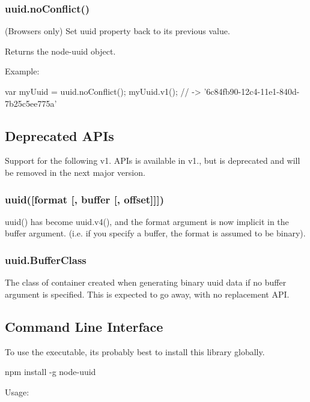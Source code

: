 \subsubsection*{uuid.\+no\+Conflict()}

(Browsers only) Set {\ttfamily uuid} property back to it\textquotesingle{}s previous value.

Returns the node-\/uuid object.

Example\+:


\begin{DoxyCode}
var myUuid = uuid.noConflict();
myUuid.v1(); // -> '6c84fb90-12c4-11e1-840d-7b25c5ee775a'
\end{DoxyCode}


\subsection*{Deprecated A\+P\+Is}

Support for the following v1. A\+P\+Is is available in v1., but is deprecated and will be removed in the next major version.

\subsubsection*{uuid(\mbox{[}format \mbox{[}, buffer \mbox{[}, offset\mbox{]}\mbox{]}\mbox{]})}

uuid() has become uuid.\+v4(), and the {\ttfamily format} argument is now implicit in the {\ttfamily buffer} argument. (i.\+e. if you specify a buffer, the format is assumed to be binary).

\subsubsection*{uuid.\+Buffer\+Class}

The class of container created when generating binary uuid data if no buffer argument is specified. This is expected to go away, with no replacement A\+PI.

\subsection*{Command Line Interface}

To use the executable, it\textquotesingle{}s probably best to install this library globally.

{\ttfamily npm install -\/g node-\/uuid}

Usage\+:


